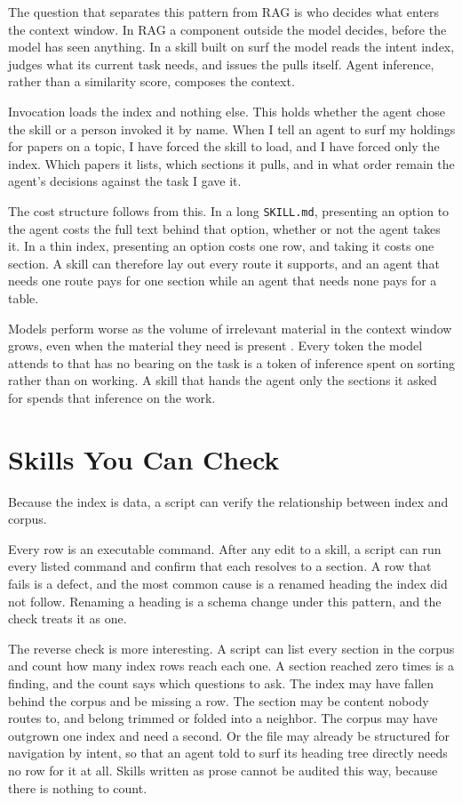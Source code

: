 \documentclass[11pt]{article}
\begin{document}
The question that separates this pattern from RAG is who decides what enters
the context window. In RAG a component outside the model decides, before the
model has seen anything. In a skill built on surf the model reads the intent
index, judges what its current task needs, and issues the pulls itself. Agent
inference, rather than a similarity score, composes the context.

Invocation loads the index and nothing else. This holds whether the agent chose
the skill or a person invoked it by name. When I tell an agent to surf my
holdings for papers on a topic, I have forced the skill to load, and I have
forced only the index. Which papers it lists, which sections it pulls, and in
what order remain the agent's decisions against the task I gave it.

The cost structure follows from this. In a long \texttt{SKILL.md}, presenting an
option to the agent costs the full text behind that option, whether or not the
agent takes it. In a thin index, presenting an option costs one row, and taking
it costs one section. A skill can therefore lay out every route it supports, and
an agent that needs one route pays for one section while an agent that needs
none pays for a table.

Models perform worse as the volume of irrelevant material in the context window
grows, even when the material they need is present \cite{liu2024,hong2025}.
Every token the model attends to that has no bearing on the task is a token of
inference spent on sorting rather than on working. A skill that hands the agent
only the sections it asked for spends that inference on the work.

\section{Skills You Can Check}
\label{sec:check}

Because the index is data, a script can verify the relationship between index
and corpus.

Every row is an executable command. After any edit to a skill, a script can run
every listed command and confirm that each resolves to a section. A row that
fails is a defect, and the most common cause is a renamed heading the index did
not follow. Renaming a heading is a schema change under this pattern, and the
check treats it as one.

The reverse check is more interesting. A script can list every section in the
corpus and count how many index rows reach each one. A section reached zero
times is a finding, and the count says which questions to ask. The index may
have fallen behind the corpus and be missing a row. The section may be content
nobody routes to, and belong trimmed or folded into a neighbor. The corpus may
have outgrown one index and need a second. Or the file may already be
structured for navigation by intent, so that an agent told to surf its heading
tree directly needs no row for it at all. Skills written as prose cannot be
audited this way, because there is nothing to count.
\end{document}
